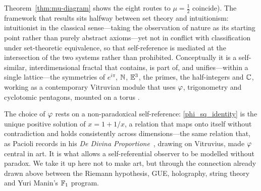 Theorem~\ref{thm:mu-diagram} shows the eight routes to $\mu=\tfrac12$ coincide). The framework
that results sits halfway between set theory and intuitionism: intuitionist in the classical
sense---taking the observation of nature as its starting point rather than purely abstract
axioms---yet not in conflict with classification under set-theoretic equivalence, so that
self-reference is mediated at the intersection of the two systems rather than prohibited.
Conceptually it is a self-similar, interdimensional fractal that contains, is part of, and
unifies---within a single lattice---the symmetries of $e^{i\pi}$, $\mathbb{N}$, $\mathbb{E}^3$, the primes,
the half-integers and $\mathbb{C}$, working as a contemporary Vitruvian module that uses $\varphi$,
trigonometry and cyclotomic pentagons, mounted on a torus .

The choice of $\varphi$ rests on a non-paradoxical
self-reference:\label{sssec:selectphi} \eqref{phi_sq_identity} is the unique positive solution of
$x=1+1/x$, a relation that maps onto itself without contradiction and holds consistently
across dimensions---the same relation that, as Pacioli records in his \emph{De Divina
Proportione}~\cite{pacioli1509}, drawing on Vitruvius, made $\varphi$ central in art. It is
what allows a self-referential observer to be modelled without paradox. We take it up here
not to make art, but through the connection already drawn above between the Riemann
hypothesis, GUE, holography, string theory and Yuri Manin's $\mathbb{F}_1$ program.

